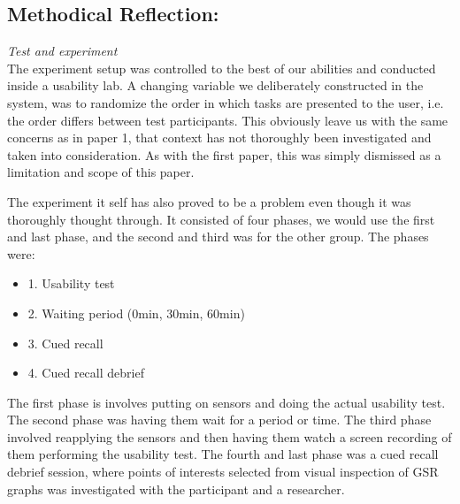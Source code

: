 \subsection{Methodical Reflection:}
\textit{Test and experiment}\\
The experiment setup was controlled to the best of our abilities and conducted inside a usability lab. A changing
variable we deliberately constructed in the system, was to randomize the order in which tasks are presented to the user,
i.e. the order differs between test participants.
This obviously leave us with the same concerns as in paper 1, that context has not thoroughly been investigated and taken
into consideration. As with the first paper, this was simply dismissed as a limitation and scope of this paper.

The experiment it self has also proved to be a problem even though it was thoroughly thought through. 
It consisted of four phases, we would use the first and last phase, and the second and third was for the other group. The phases were:

\begin{itemize}
\item 1. Usability test
\item 2. Waiting period (0min, 30min, 60min)
\item 3. Cued recall
\item 4. Cued recall debrief
\end{itemize}

The first phase is involves putting on sensors and doing the actual usability test. The second phase was having them wait for a period or time. 
The third phase involved reapplying the sensors and then having them watch a screen recording of them performing the usability test.
The fourth and last phase was a cued recall debrief session, where points of interests selected from visual inspection of GSR graphs was investigated with the participant and a researcher.


